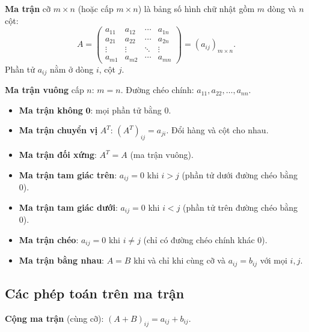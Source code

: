 \documentclass[12pt,a4paper]{article}
\begin{document}
\begin{dinhnghia}
  \textbf{Ma trận} cỡ $m \times n$ (hoặc cấp $m \times n$) là bảng số hình chữ nhật gồm $m$ dòng và $n$ cột:
  \[
    A = \begin{pmatrix}
      a_{11} & a_{12} & \cdots & a_{1n} \\
      a_{21} & a_{22} & \cdots & a_{2n} \\
      \vdots & \vdots & \ddots & \vdots \\
      a_{m1} & a_{m2} & \cdots & a_{mn}
    \end{pmatrix} = (a_{ij})_{m \times n}.
  \]
  Phần tử $a_{ij}$ nằm ở dòng $i$, cột $j$.
\end{dinhnghia}

\begin{dinhnghia}
  \textbf{Ma trận vuông} cấp $n$: $m = n$. Đường chéo chính: $a_{11}, a_{22}, \ldots, a_{nn}$.
\end{dinhnghia}

\begin{tinhchat}[title={Các loại ma trận đặc biệt}]
  \begin{itemize}
    \item \textbf{Ma trận không} $\mathbf{0}$: mọi phần tử bằng 0.
    \item \textbf{Ma trận chuyển vị} $A^T$: $(A^T)_{ij} = a_{ji}$. Đổi hàng và cột cho nhau.
    \item \textbf{Ma trận đối xứng}: $A^T = A$ (ma trận vuông).
    \item \textbf{Ma trận tam giác trên}: $a_{ij} = 0$ khi $i > j$ (phần tử dưới đường chéo bằng 0).
    \item \textbf{Ma trận tam giác dưới}: $a_{ij} = 0$ khi $i < j$ (phần tử trên đường chéo bằng 0).
    \item \textbf{Ma trận chéo}: $a_{ij} = 0$ khi $i \ne j$ (chỉ có đường chéo chính khác 0).
    \item \textbf{Ma trận bằng nhau}: $A = B$ khi và chỉ khi cùng cỡ và $a_{ij} = b_{ij}$ với mọi $i, j$.
  \end{itemize}
\end{tinhchat}

\subsection{Các phép toán trên ma trận}

\begin{dinhnghia}
  \textbf{Cộng ma trận} (cùng cỡ): $(A + B)_{ij} = a_{ij} + b_{ij}$.
\end{dinhnghia}
\end{document}

